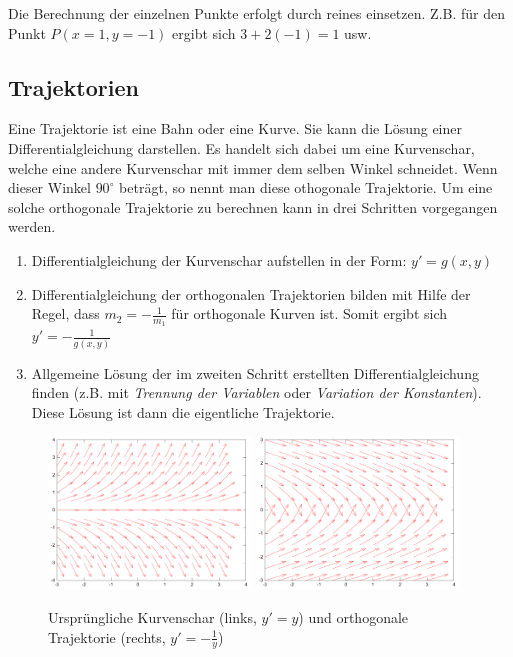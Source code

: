 \noindent
Die Berechnung der einzelnen Punkte erfolgt durch reines einsetzen.
Z.B. für den Punkt $P(x=1, y=-1)$ ergibt sich $3+2(-1)=1$ usw.

\subsection{Trajektorien}
Eine Trajektorie ist eine Bahn oder eine Kurve. Sie kann die Lösung einer 
Differentialgleichung darstellen. Es handelt sich dabei um eine Kurvenschar, 
welche eine andere Kurvenschar mit immer dem selben Winkel schneidet. Wenn 
dieser Winkel $90^{\circ}$ beträgt, so nennt man diese othogonale Trajektorie.
Um eine solche orthogonale Trajektorie zu berechnen kann in drei Schritten
vorgegangen werden.
\begin{enumerate}
  \item Differentialgleichung der Kurvenschar aufstellen in der Form: 
	$y'=g(x,y)$
  \item Differentialgleichung der orthogonalen Trajektorien bilden
	mit Hilfe der Regel, dass $m_2=-\frac{1}{m_1}$ für orthogonale
	Kurven ist. Somit ergibt sich $y'=-\frac{1}{g(x,y)}$
  \item Allgemeine Lösung der im zweiten Schritt erstellten
	Differentialgleichung finden (z.B. mit \emph{Trennung der Variablen}
	oder \emph{Variation der Konstanten}). Diese Lösung ist dann die 
	eigentliche Trajektorie.
\end{enumerate}

\begin{figure}[h!]
	\centering
	\includegraphics[width=0.48\textwidth]{trajektorien1.pdf}
	\includegraphics[width=0.48\textwidth]{trajektorien2.pdf}
	\caption{Ursprüngliche Kurvenschar (links, $y'=y$) 
	und orthogonale Trajektorie (rechts, $y'=-\frac{1}{y}$)}
\end{figure}

